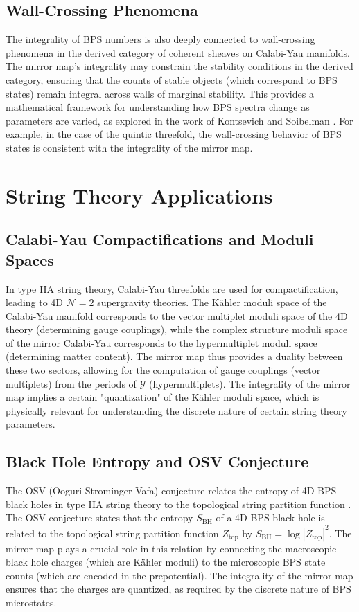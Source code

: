 \documentclass{book}
\newcommand{\calY}{\mathcal{Y}} %
\theoremstyle{definition}
\begin{document}
\subsection{Wall-Crossing Phenomena}
The integrality of BPS numbers is also deeply connected to wall-crossing phenomena in the derived category of coherent sheaves on Calabi-Yau manifolds. The mirror map's integrality may constrain the stability conditions in the derived category, ensuring that the counts of stable objects (which correspond to BPS states) remain integral across walls of marginal stability. This provides a mathematical framework for understanding how BPS spectra change as parameters are varied, as explored in the work of Kontsevich and Soibelman \cite{KontsevichSoibelman2008}. For example, in the case of the quintic threefold, the wall-crossing behavior of BPS states is consistent with the integrality of the mirror map.

\section{String Theory Applications}

\subsection{Calabi-Yau Compactifications and Moduli Spaces}
In type IIA string theory, Calabi-Yau threefolds are used for compactification, leading to 4D $\mathcal{N}=2$ supergravity theories. The K\"ahler moduli space of the Calabi-Yau manifold corresponds to the vector multiplet moduli space of the 4D theory (determining gauge couplings), while the complex structure moduli space of the mirror Calabi-Yau corresponds to the hypermultiplet moduli space (determining matter content). The mirror map thus provides a duality between these two sectors, allowing for the computation of gauge couplings (vector multiplets) from the periods of $\calY$ (hypermultiplets).
The integrality of the mirror map implies a certain "quantization" of the K\"ahler moduli space, which is physically relevant for understanding the discrete nature of certain string theory parameters.

\subsection{Black Hole Entropy and OSV Conjecture}
The OSV (Ooguri-Strominger-Vafa) conjecture relates the entropy of 4D BPS black holes in type IIA string theory to the topological string partition function \cite{OoguriStromingerVafa2004}. The OSV conjecture states that the entropy $S_{\text{BH}}$ of a 4D BPS black hole is related to the topological string partition function $Z_{\text{top}}$ by $S_{\text{BH}} = \log |Z_{\text{top}}|^2$. The mirror map plays a crucial role in this relation by connecting the macroscopic black hole charges (which are K\"ahler moduli) to the microscopic BPS state counts (which are encoded in the prepotential). The integrality of the mirror map ensures that the charges are quantized, as required by the discrete nature of BPS microstates.
\end{document}
